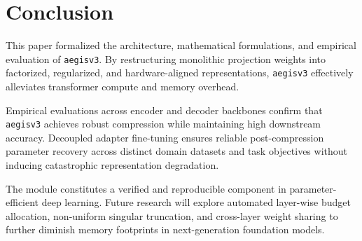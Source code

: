 \section{Conclusion}
This paper formalized the architecture, mathematical formulations, and empirical evaluation of \texttt{aegisv3}. By restructuring monolithic projection weights into factorized, regularized, and hardware-aligned representations, \texttt{aegisv3} effectively alleviates transformer compute and memory overhead.

Empirical evaluations across encoder and decoder backbones confirm that \texttt{aegisv3} achieves robust compression while maintaining high downstream accuracy. Decoupled adapter fine-tuning ensures reliable post-compression parameter recovery across distinct domain datasets and task objectives without inducing catastrophic representation degradation.

The module constitutes a verified and reproducible component in parameter-efficient deep learning. Future research will explore automated layer-wise budget allocation, non-uniform singular truncation, and cross-layer weight sharing to further diminish memory footprints in next-generation foundation models.

